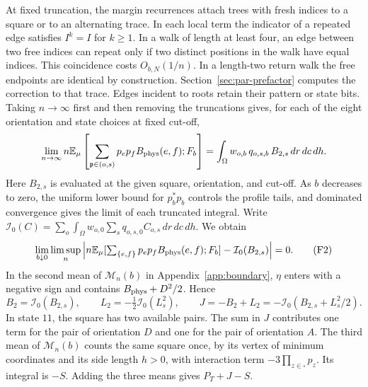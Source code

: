 At fixed truncation, the margin recurrences attach trees with fresh indices to a square or to an
alternating trace. In each local term the indicator of a repeated edge satisfies \(I^k=I\) for \(k\ge1\).
In a walk of length at least four, an edge between two free indices can repeat only if two distinct
positions in the walk have equal indices. This coincidence costs \(O_{b,N}(1/n)\). In a length-two return
walk the free endpoints are identical by construction. Section~\ref{sec:par-prefactor} computes the
correction to that trace. Edges incident to roots retain their pattern or state bits. Taking
\(n\to\infty\) first and then removing the truncations gives, for each of the eight orientation and state
choices at fixed cut-off, \[
 \lim_{n\to\infty}n\mathbb E_\mu
 \left[\sum_{\mathfrak p\in(o,s)}p_ep_f B_{\rm phys}(e,f);F_b\right]
 =\int_\Omega w_{o,b}\,q_{o,s,b}\,B_{2,s}\,dr\,dc\,dh .
\] Here \(B_{2,s}\) is evaluated at the given square, orientation, and cut-off. As \(b\) decreases to
zero, the uniform lower bound for \(p_b^*p_b\) controls the profile tails, and dominated convergence
gives the limit of each truncated integral. Write \(\mathcal I_0(C)=\sum_o\int_\Omega w_{o,0}\sum_s
q_{o,s,0}C_{o,s}\,dr\,dc\,dh\). We obtain \[
 \lim_{b\downarrow0}\limsup_n\left|
 n\mathbb E_\mu[\textstyle\sum_{\{e,f\}}p_ep_f B_{\rm phys}(e,f);F_b]
 -\mathcal I_0(B_{2,s})\right|=0. \tag{F2}
\] In the second mean of \(\mathcal M_n(b)\) in Appendix~\ref{app:boundary}, \(\eta\) enters with a
negative sign and contains \(B_{\rm phys}+D^2/2\). Hence \begin{equation}\label{eq:J-def}
 B_2=\mathcal I_0(B_{2,s}),\qquad L_2=-\tfrac12\mathcal I_0(L_s^2),\qquad
 J=-B_2+L_2=-\mathcal I_0(B_{2,s}+L_s^2/2).
\end{equation} In state \(11\), the square has two available pairs. The sum in \(J\) contributes one term
for the
pair of orientation \(D\) and one for the pair of orientation \(A\). The third mean of \(\mathcal
M_n(b)\) counts the same square once, by its vertex of minimum coordinates and its side length \(h>0\),
with interaction term \(-3\prod_{z\in\square}p_z\). Its integral is \(-S\). Adding the three means gives
\(P_T+J-S\).
